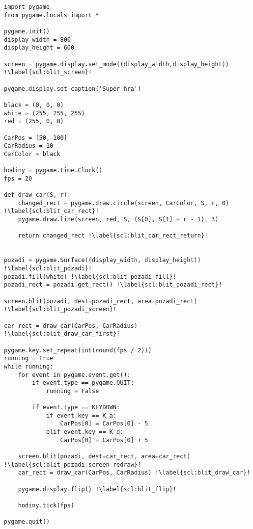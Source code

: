 \begin{minipage}[t]{.45\textwidth}
\begin{code}
\begin{verbatim}
import pygame
from pygame.locals import *

pygame.init()
display_width = 800
display_height = 600

screen = pygame.display.set_mode((display_width,display_height)) !\label{scl:blit_screen}!

pygame.display.set_caption('Super hra')

black = (0, 0, 0)
white = (255, 255, 255)
red = (255, 0, 0)

CarPos = [50, 100]
CarRadius = 10
CarColor = black

hodiny = pygame.time.Clock()
fps = 20

def draw_car(S, r):
    changed_rect = pygame.draw.circle(screen, CarColor, S, r, 0) !\label{scl:blit_car_rect}!
    pygame.draw.line(screen, red, S, (S[0], S[1] + r - 1), 3)
    
    return changed_rect !\label{scl:blit_car_rect_return}!


pozadi = pygame.Surface((display_width, display_height)) !\label{scl:blit_pozadi}!
pozadi.fill(white) !\label{scl:blit_pozadi_fill}!
pozadi_rect = pozadi.get_rect() !\label{scl:blit_pozadi_rect}!

screen.blit(pozadi, dest=pozadi_rect, area=pozadi_rect) !\label{scl:blit_pozadi_screen}!

car_rect = draw_car(CarPos, CarRadius) !\label{scl:blit_draw_car_first}!

pygame.key.set_repeat(int(round(fps / 2)))
running = True
while running:
    for event in pygame.event.get(): 
        if event.type == pygame.QUIT:
            running = False

        if event.type == KEYDOWN:
            if event.key == K_a:
                CarPos[0] = CarPos[0] - 5
            elif event.key == K_d:
                CarPos[0] = CarPos[0] + 5

    screen.blit(pozadi, dest=car_rect, area=car_rect) !\label{scl:blit_pozadi_screen_redraw}!
    car_rect = draw_car(CarPos, CarRadius) !\label{scl:blit_draw_car}!
 
    pygame.display.flip() !\label{scl:blit_flip}!
    
    hodiny.tick(fps)

pygame.quit()
\end{verbatim}

\label{code:grafika_blit}
\end{code}
\end{minipage}
